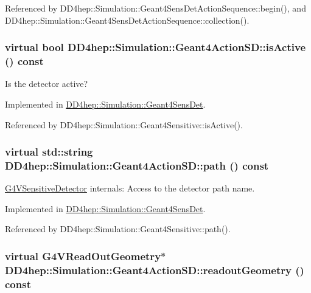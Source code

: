 Referenced by DD4hep::Simulation::Geant4SensDetActionSequence::begin(), and DD4hep::Simulation::Geant4SensDetActionSequence::collection().\hypertarget{class_d_d4hep_1_1_simulation_1_1_geant4_action_s_d_a2c3791fc610294f1d3fc9ff6fe0e755f}{
\subsubsection[{isActive}]{\setlength{\rightskip}{0pt plus 5cm}virtual bool DD4hep::Simulation::Geant4ActionSD::isActive () const}}
\label{class_d_d4hep_1_1_simulation_1_1_geant4_action_s_d_a2c3791fc610294f1d3fc9ff6fe0e755f}


Is the detector active? 

Implemented in \hyperlink{class_d_d4hep_1_1_simulation_1_1_geant4_sens_det_a862cd7e6673249aaf71da2eda32c4777}{DD4hep::Simulation::Geant4SensDet}.

Referenced by DD4hep::Simulation::Geant4Sensitive::isActive().\hypertarget{class_d_d4hep_1_1_simulation_1_1_geant4_action_s_d_a8d3333538a535ac963931173f15acfeb}{
\subsubsection[{path}]{\setlength{\rightskip}{0pt plus 5cm}virtual std::string DD4hep::Simulation::Geant4ActionSD::path () const}}
\label{class_d_d4hep_1_1_simulation_1_1_geant4_action_s_d_a8d3333538a535ac963931173f15acfeb}


\hyperlink{class_g4_v_sensitive_detector}{G4VSensitiveDetector} internals: Access to the detector path name. 

Implemented in \hyperlink{class_d_d4hep_1_1_simulation_1_1_geant4_sens_det_ab5c9a049efc9b8e19c75fc11aa1622cc}{DD4hep::Simulation::Geant4SensDet}.

Referenced by DD4hep::Simulation::Geant4Sensitive::path().\hypertarget{class_d_d4hep_1_1_simulation_1_1_geant4_action_s_d_abf432e0098d25759837ddc2af5dc6c16}{
\subsubsection[{readoutGeometry}]{\setlength{\rightskip}{0pt plus 5cm}virtual G4VReadOutGeometry$\ast$ DD4hep::Simulation::Geant4ActionSD::readoutGeometry () const}}
\label{class_d_d4hep_1_1_simulation_1_1_geant4_action_s_d_abf432e0098d25759837ddc2af5dc6c16}


